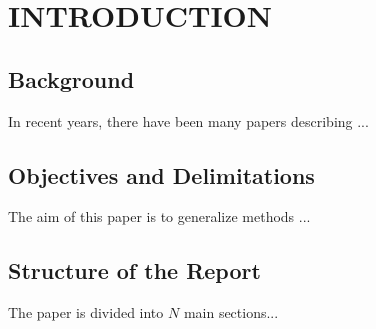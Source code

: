 \section{ INTRODUCTION }

\subsection{ Background }
In recent years, there have been many papers describing ...

\subsection{ Objectives and Delimitations }
The aim of this paper is to generalize methods ...

\subsection{ Structure of the Report }
The paper is divided into $N$ main sections...